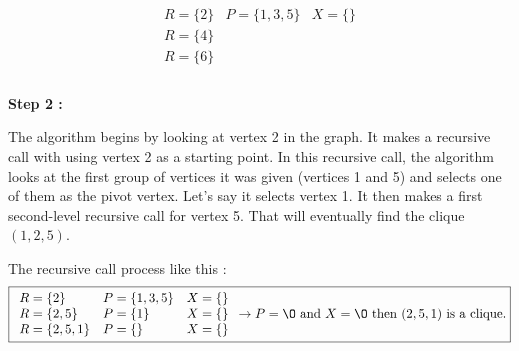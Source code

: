 $$ \boxed{
        \begin{array}{lll}
            R = \{2\} & P = \{1,3,5\} & X =\{\} \\
            R = \{4\}                           \\
            R = \{6\}                           \\
        \end{array}
    }$$
\\
\hspace*{1cm}  \textbf{Step 2 :}
\\
\begin{minipage}{0.4\textwidth}
\end{minipage}
\begin{minipage}{0.6\textwidth}
    The algorithm begins by looking at vertex 2 in the graph. It makes a recursive call with using vertex 2 as a starting point. In this recursive call, the algorithm looks at the first group of vertices it was given (vertices 1 and 5) and selects one of them as the pivot vertex. Let's say it selects vertex 1. It then makes a first second-level recursive call for vertex 5. That will eventually find the clique $(1,2,5)$.
\end{minipage}
The recursive call process like this  :
$$ \boxed{
        \begin{array}{lll}
            R = \{2\}     & P = \{1,3,5\} & X = \{\} \\
            R = \{2,5\}   & P = \{1\}     & X = \{\} \\
            R = \{2,5,1\} & P = \{\}      & X = \{\} \\
        \end{array}
        \rightarrow P = \O \text{ and } X = \O \text{ then } (2,5,1) \text{ is a clique.}
    }$$
\\
\\
\begin{minipage}{0.4\textwidth}
\end{minipage}
